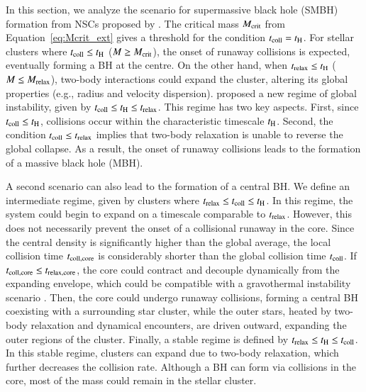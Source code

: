 In this section, we analyze the scenario for supermassive black hole (SMBH) formation from NSCs proposed by \citet{escala2021observational}. The critical mass $M_{\rm crit}$ from Equation~\eqref{eq:Mcrit_ext} gives a threshold for the condition $t_{\rm coll} = t_{\rm H}$. For stellar clusters where $t_{\rm coll} \leq t_{\rm H}$ ($M \geq M_{\rm crit}$), the onset of runaway collisions is expected, eventually forming a BH at the centre.  On the other hand, when $t_{\rm relax} \leq t_{\rm H}$ ($M \leq M_{\rm relax}$), two-body interactions could expand the cluster, altering its global properties (e.g., radius and velocity dispersion). \citet{escala2021observational} proposed a new regime of global instability, given by $t_{\rm coll} \leq t_{\rm H} \leq t_{\rm relax}$. This regime has two key aspects. First, since $t_{\rm coll} \leq t_{\rm H}$, collisions occur within the characteristic timescale $t_{\rm H}$. Second, the condition $t_{\rm coll} \leq t_{\rm relax}$ implies that two-body relaxation is unable to reverse the global collapse. As a result, the onset of runaway collisions leads to the formation of a massive black hole (MBH). 

A second scenario can also lead to the formation of a central BH. We define an intermediate regime, given by clusters where $t_{\rm relax} \leq t_{\rm coll} \leq t_{\rm H}$. In this regime, the system could begin to expand on a timescale comparable to $t_{\rm relax}$. However, this does not necessarily prevent the onset of a collisional runaway in the core. Since the central density is significantly higher than the global average, the local collision time $t_{\rm coll, core}$ is considerably shorter than the global collision time $t_{\rm coll}$. If $t_{\rm coll, core} \leq t_{\rm relax, core}$, the core could contract and decouple dynamically from the expanding envelope, which could be compatible with a gravothermal instability scenario \citep{1987degc.book.....S, cohn1980late}. Then, the core could undergo runaway collisions, forming a central BH coexisting with a surrounding star cluster, while the outer stars, heated by two-body relaxation and dynamical encounters, are driven outward, expanding the outer regions of the cluster. Finally, a stable regime is defined by $t_{\rm relax} \leq t_{\rm H} \leq t_{\rm coll}$. In this stable regime, clusters can expand due to two-body relaxation, which further decreases the collision rate. Although a BH can form via collisions in the core, most of the mass could remain in the stellar cluster.

